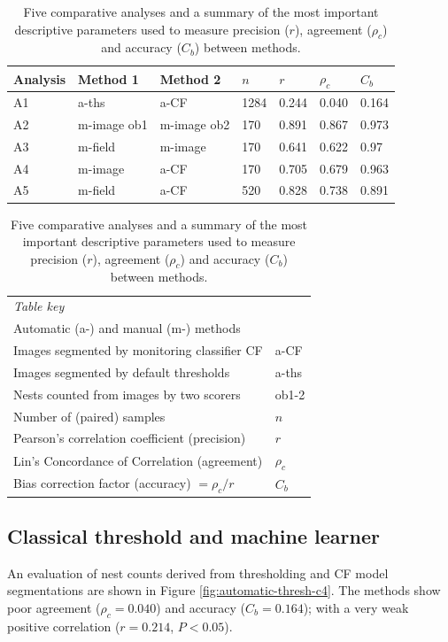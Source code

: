 \begin{table}[!htbp]\myfloatalign
\caption[Summary of comparative analyses.]{Five comparative analyses and a summary of the most important descriptive parameters used to measure precision ($r$), agreement ($\rho_{c}$) and accuracy ($C_{b}$) between methods.}\label{tab:counts-by-different-methods}
\begin{tabular}{p{0.4in}p{0.9in}p{0.9in}p{0.3in}p{0.3in}p{0.3in}p{0.3in}} \toprule
Analysis & Method 1 & Method 2 & $ n $ & $r$ & $\rho_{c}$ & $C_{b}$ \\ \midrule
A1 & a-ths & a-CF & 1284 & 0.244 & 0.040 & 0.164 \\
A2 & m-image ob1 & m-image ob2 & 170 & 0.891 & 0.867 & 0.973 \\
A3 & m-field & m-image & 170 & 0.641 & 0.622 & 0.97 \\
A4 & m-image & a-CF & 170 & 0.705  &  0.679 & 0.963 \\
A5 & m-field & a-CF & 520 &  0.828  & 0.738 & 0.891 \\ \bottomrule
\end{tabular} 
\begin{tabular}{p{3.6in}l} \\
\emph{Table key} & \\ 
Automatic (a-) and manual (m-) methods &\\
Images segmented by monitoring classifier CF  &  a-CF \\
Images segmented by default thresholds & a-ths\\
Nests counted from images by two scorers  & ob1-2 \\
Number of (paired) samples &  $ n $\\
Pearson's correlation coefficient (precision)&  $r$ \\
Lin's Concordance of Correlation (agreement) &  $ \rho_c $ \\
Bias correction factor (accuracy)  $ = \rho_c/r $ & $ C_{b} $ \\
\end{tabular}
\end{table}

\subsection{Classical threshold and machine learner}\label{sec:classical-threshold-and-machine-learner}

An evaluation of nest counts derived from thresholding and CF model segmentations are shown in Figure \ref{fig:automatic-thresh-c4}. The methods show poor agreement ($\rho_{c} = 0.040$) and accuracy ($C_{b} = 0.164$); with a very weak positive correlation ($r = 0.214$, $P < 0.05 $).

